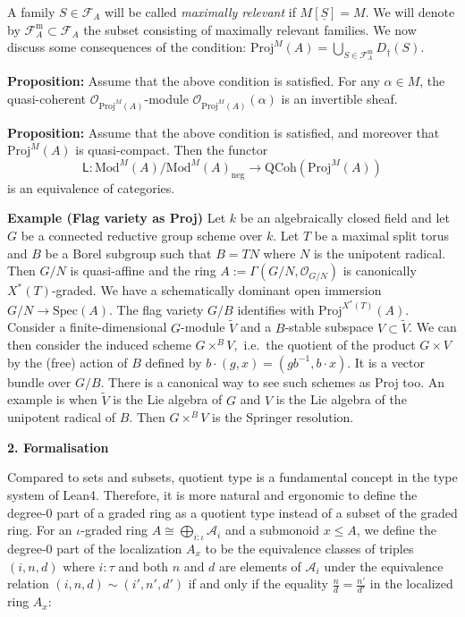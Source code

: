 \documentclass[graybox]{svmult}
\begin{document}
A family $S \in \mathcal{F}_A$ will be called \emph{maximally relevant} if $M[\underline{S}]=M$.   We will denote by $\mathcal{F}_A^{\mathrm{m}} \subset \mathcal{F}_A$ the subset consisting of maximally relevant families. We now discuss some consequences of the condition:
$
\mathrm{Proj}^M(A) = \bigcup_{S \in \mathcal{F}_A^{\mathrm{m}}} D_\dag(S).$



\vspace{0.25\baselineskip}
\noindent
\textbf{{Proposition:}}
Assume that the above condition is satisfied. For any $ \alpha \in M$, the quasi-coherent $\mathcal{O}_{\mathrm{Proj}^M(A)}$-module $\mathcal{O}_{\mathrm{Proj}^M(A)} (\alpha)$ is an invertible sheaf.



\vspace{0.25\baselineskip}
\noindent
\textbf{{Proposition:}}
Assume that the above condition is satisfied, and moreover that $\mathrm{Proj}^M(A)$ is quasi-compact. Then the functor
\[
\mathsf{L} : \mathrm{Mod}^M(A) / \mathrm{Mod}^M(A)_{\mathrm{neg}} \to \mathrm{QCoh}(\mathrm{Proj}^M(A))
\]
is an equivalence of categories.





\vspace{0.25\baselineskip}
\noindent
\textbf{Example (Flag variety as Proj)}
 Let $k$ be an algebraically closed field and let $G$ be
a connected reductive group scheme over $k.$ Let $T$ be a maximal split torus
and $B$ be a Borel subgroup such that $B = T N$ where $N$ is the unipotent
radical. Then $G/N$ is quasi-affine and the ring $A := \Gamma (G/N, \mathcal{O}_{G/N} )$ is canonically $X^*(T)$-graded. We have a schematically dominant open immersion
$G/N \to \mathrm{Spec}(A)$. 
The flag variety $G/B$ identifies with $\mathrm{Proj}^{X^*(T)} (A)$.
Consider a finite-dimensional $G$-module $\widetilde{V}$ and a $B$-stable subspace $V \subset \widetilde{V}$. 
We can then consider the induced scheme
$
 G \times^{B} V,
$
i.e.~the quotient of the product $G \times V$ by the (free) action of $B$ defined by $b \cdot (g,x) = (gb^{-1}, b \cdot x)$.  It is a vector bundle over $G/B$.
There is a canonical way to see such schemes as Proj too.
An example is when $\widetilde{V}$ is the Lie algebra of $G$ and $V$ is the Lie algebra of the unipotent radical of $B$. Then $G \times^{B} V$ is the Springer resolution.

\begin{flushleft}
\textbf{2. Formalisation}
\end{flushleft}
Compared to sets and subsets, quotient type is a fundamental concept in the type system of Lean4. 
Therefore, it is more natural and ergonomic to define the degree-$0$ part of a graded ring as a quotient type 
instead of a subset of the graded ring. For an $\iota$-graded ring $A \cong \bigoplus_{i : \iota} \mathcal{A}_i$ and a submonoid $x \le A$, 
we define the degree-$0$ part of the localization $A_x$ to be the equivalence classes of triples $(i, n, d)$ where 
$i : \tau$ and both $n$ and $d$ are elements of $\mathcal{A}_i$ under the equivalence relation 
$(i, n, d) \sim (i', n', d')$ if and only if the equality $\frac{n}{d} = \frac{n'}{d'}$ in the localized ring $A_x$:
\end{document}
